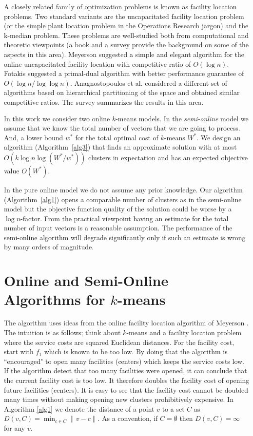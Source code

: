 \documentclass[11pt,twoside]{article}
\begin{document}
A closely related family of optimization problems is known as facility location problems. Two standard variants are the uncapacitated facility location problem (or the simple plant location problem in the Operations Research jargon) and the k-median problem. These problems are well-studied both from computational and theoretic viewpoints (a book \cite{drezner2004facility} and a survey \cite{Vygen05} provide the  background on some of the aspects in this area). Meyerson \cite{Meyerson01} suggested a simple and elegant algorithm for the online uncapacitated facility location with competitive ratio of $O(\log n)$. Fotakis \cite{Fotakis08} suggested a primal-dual algorithm with better performance guarantee of $O(\log n/\log \log n)$. Anagnostopoulos et al. \cite{AilonJM09} considered a different set of algorithms based on hierarchical partitioning of the space and obtained similar competitive ratios. The survey \cite{Fotakis11} summarizes the results in this area.

In this work we consider two online $k$-means models. In the {\it semi-online} model we assume that we know the total number of vectors that we are going to process. 
And, a lower bound $w^*$ for the total optimal cost of $k$-means $W^*$. 
We design an algorithm (Algorithm~\ref{alg3}) that finds an approximate solution with at most $O(k\log n \log (W^*/w^*))$ clusters in expectation and has an expected objective value $O(W^*)$.

In the pure online model we do not assume any prior knowledge.
Our algorithm (Algorithm~\ref{alg1}) opens a comparable number of clusters as in the semi-online model but the objective function quality of the solution could be worse by a $\log n$-factor. 
From the practical viewpoint having an estimate for the total number of input vectors is a reasonable assumption. 
The performance of the semi-online algorithm will degrade significantly only if such an estimate is wrong by many orders of magnitude.  




\section{Online and Semi-Online Algorithms for $k$-means}\label{alg}

The algorithm uses ideas from the online facility location algorithm of Meyerson \cite{Meyerson01}.
The intuition is as follows; think about $k$-means and a facility location problem where the service costs are squared Euclidean distances.
For the facility cost, start with $f_1$ which is known to be too low. 
By doing that the algorithm is ``encouraged" to open many facilities (centers) which keeps the service costs low.
If the algorithm detect that too many facilities were opened, it can conclude that the current facility cost is too low. 
It therefore doubles the facility cost of opening future facilities (centers).
It is easy to see that the facility cost cannot be doubled many times without making opening new clusters prohibitively expensive.
In Algorithm \ref{alg1} we denote the distance of a point $v$ to a set $C$ as $D(v, C) = \min_{c \in C}\|v - c\|$.
As a convention, if $C = \emptyset$ then $D(v, C) = \infty$ for any $v$.
\end{document}
